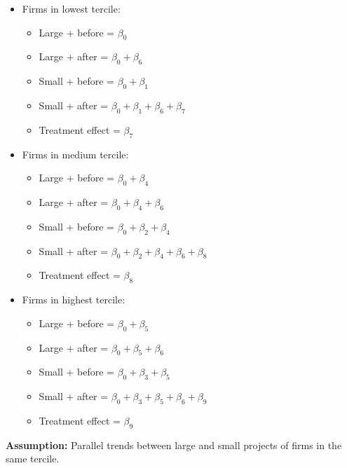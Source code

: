 \documentclass[
]{article}
\providecommand{\tightlist}{%
  \setlength{\itemsep}{0pt}\setlength{\parskip}{0pt}}
\begin{document}
\begin{itemize}
\tightlist
\item
  Firms in lowest tercile:

  \begin{itemize}
  \tightlist
  \item
    Large + before = \(\beta_0\)
  \item
    Large + after = \(\beta_0 + \beta_6\)
  \item
    Small + before = \(\beta_0 + \beta_1\)
  \item
    Small + after = \(\beta_0 + \beta_1 + \beta_6 + \beta_7\)
  \item
    Treatment effect = \(\beta_7\)
  \end{itemize}
\item
  Firms in medium tercile:

  \begin{itemize}
  \tightlist
  \item
    Large + before = \(\beta_0+\beta_4\)
  \item
    Large + after = \(\beta_0+\beta_4+\beta_6\)
  \item
    Small + before = \(\beta_0+\beta_2+\beta_4\)
  \item
    Small + after = \(\beta_0+\beta_2+\beta_4 + \beta_6 + \beta_8\)
  \item
    Treatment effect = \(\beta_8\)
  \end{itemize}
\item
  Firms in highest tercile:

  \begin{itemize}
  \tightlist
  \item
    Large + before = \(\beta_0+\beta_5\)
  \item
    Large + after = \(\beta_0 + \beta_5+\beta_6\)
  \item
    Small + before = \(\beta_0+\beta_3+\beta_5\)
  \item
    Small + after = \(\beta_0 + \beta_3 + \beta_5 + \beta_6 + \beta_9\)
  \item
    Treatment effect = \(\beta_9\)
  \end{itemize}
\end{itemize}

\textbf{Assumption:} Parallel trends between large and small projects of
firms in the same tercile.
\end{document}

